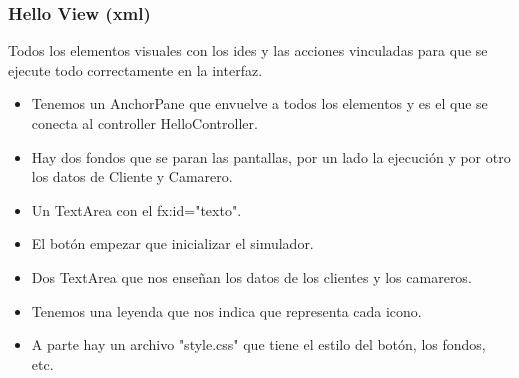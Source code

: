 \documentclass[a4paper,12pt]{article}
\begin{document}
\subsubsection{Hello View (xml)}
Todos los elementos visuales con los ides y las acciones vinculadas para que se ejecute todo correctamente en la interfaz.
\begin{itemize}
\item Tenemos un AnchorPane que envuelve a todos los elementos y es el que se conecta al controller HelloController.
\item Hay dos fondos que se paran las pantallas, por un lado la ejecución y por otro los datos de Cliente y Camarero.
\item Un TextArea con el fx:id="texto".
\item El botón empezar que inicializar el simulador.
\item Dos TextArea que nos enseñan los datos de los clientes y los camareros.
\item Tenemos una leyenda que nos indica que representa cada icono.
\item A parte hay un archivo "style.css" que tiene el estilo del botón, los fondos, etc.
\end{itemize}
\end{document}
